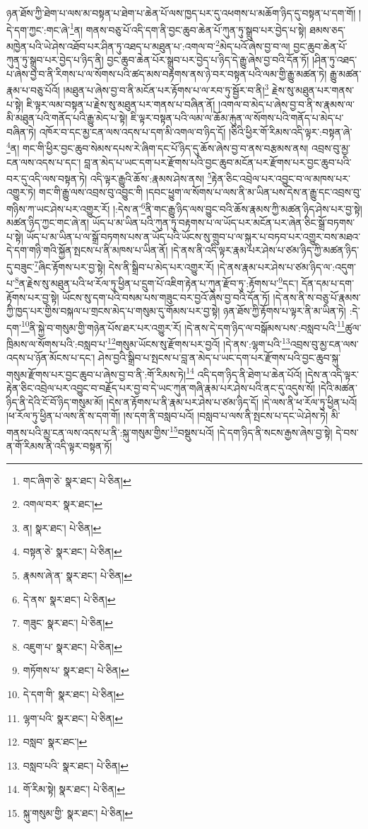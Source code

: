 ཉན་ཐོས་ཀྱི་ཐེག་པ་ལས་མ་བསྟན་པ་ཐེག་པ་ཆེན་པོ་ལས་ཁྱད་པར་དུ་འཕགས་པ་མཆོག་ཉིད་དུ་བསྟན་པ་དག་གོ། །དེ་དག་ཀྱང་:གང་ཞེ་\footnote{གང་ཞིག་ཅེ་  སྣར་ཐང་།  པེ་ཅིན། }ན། གནས་བཅུ་པོ་འདི་དག་ནི་བྱང་ཆུབ་ཆེན་པོ་ཀུན་ཏུ་སྒྲུབ་པར་བྱེད་པ་སྟེ། ཐམས་ཅད་མཁྱེན་པའི་ཡེ་ཤེས་འཐོབ་པར་ཤིན་ཏུ་འཐད་པ་མཐུན་པ་:འགལ་བ་\footnote{འགལ་བར་  སྣར་ཐང་། }མེད་པའོ་ཞེས་བྱ་བ་ལ། བྱང་ཆུབ་ཆེན་པོ་ཀུན་ཏུ་སྒྲུབ་པར་བྱེད་པ་ཉིད་ནི། བྱང་ཆུབ་ཆེན་པོར་སྒྲུབ་པར་བྱེད་པ་ཉིད་དེ་རྒྱུ་ཞེས་བྱ་བའི་དོན་ཏོ། །ཤིན་ཏུ་འཐད་པ་ཞེས་བྱ་བ་ནི་རིགས་པ་ལ་སོགས་པའི་ཚད་མས་བརྟགས་ནས་ཉེ་བར་བསྟན་པའི་ལམ་གྱི་རྒྱུ་མཚན་ཏེ། རྒྱུ་མཚན་རྣམ་པ་བཅུ་པོའོ། །མཐུན་པ་ཞེས་བྱ་བ་ནི་མངོན་པར་རྟོགས་པ་ལ་རབ་ཏུ་སྦྱོར་བ་ནི།\footnote{ན།  སྣར་ཐང་།  པེ་ཅིན། } རྗེས་སུ་མཐུན་པར་གནས་པ་སྟེ། ཇི་ལྟར་ལམ་བསྟན་པ་རྗེས་སུ་མཐུན་པར་གནས་པ་བཞིན་ནོ། །འགལ་བ་མེད་པ་ཞེས་བྱ་བ་ནི་ས་རྣམས་ལ་མི་མཐུན་པའི་གནོད་པའི་རྒྱུ་མེད་པ་སྟེ། ཇི་ལྟར་བསྟན་པའི་ལམ་ལ་ཆོམ་རྐུན་ལ་སོགས་པའི་གནོད་པ་མེད་པ་བཞིན་ཏེ། འཁོར་བ་དང་མྱ་ངན་ལས་འདས་པ་དག་མི་འགལ་བ་ཉིད་དོ། །ཅིའི་ཕྱིར་གོ་རིམས་འདི་ལྟར་:བསྟན་ཞེ་\footnote{བསྟན་ཅེ་  སྣར་ཐང་།  པེ་ཅིན། }ན། གང་གི་ཕྱིར་བྱང་ཆུབ་སེམས་དཔས་རེ་ཞིག་དང་པོ་ཉིད་དུ་ཆོས་ཞེས་བྱ་བ་ནས་བརྩམས་ནས། འབྲས་བུ་མྱ་ངན་ལས་འདས་པ་དང་། བླ་ན་མེད་པ་ཡང་དག་པར་རྫོགས་པའི་བྱང་ཆུབ་མངོན་པར་རྫོགས་པར་བྱང་ཆུབ་པའི་བར་དུ་འདི་ལས་བསྟན་ཏེ། འདི་ལྟར་རྒྱུའི་ཆོས་:རྣམས་ཤེས་ནས། \footnote{རྣམས་ཞེ་ན་  སྣར་ཐང་།  པེ་ཅིན། }རྟེན་ཅིང་འབྲེལ་པར་འབྱུང་བ་ལ་མཁས་པར་འགྱུར་ཏེ། གང་གི་རྒྱུ་ལས་འབྲས་བུ་འབྱུང་གི །དབང་ཕྱུག་ལ་སོགས་པ་ལས་ནི་མ་ཡིན་པས་དེས་ན་རྒྱུ་དང་འབྲས་བུ་གཉིས་ཀ་ཡང་ཤེས་པར་འགྱུར་རོ། །:དེས་ན་\footnote{དེ་ནས་  སྣར་ཐང་།  པེ་ཅིན། }ནི་གང་རྒྱུ་ཉིད་ལས་བྱུང་བའི་ཆོས་རྣམས་ཀྱི་མཚན་ཉིད་ཤེས་པར་བྱ་སྟེ། མཚན་ཉིད་ཀྱང་གང་ཞེ་ན། ཡོད་པ་མ་ཡིན་པའི་ཀུན་ཏུ་བརྟགས་པ་ལ་ཡོད་པར་མངོན་པར་ཞེན་ཅིང་སྒྲོ་བཏགས་པ་སྟེ། ཡོད་པ་མ་ཡིན་པ་ལ་སྒྲོ་བཏགས་པས་ན་ཡོད་པའི་ཡོངས་སུ་གྲུབ་པ་ལ་སྐུར་པ་བཏབ་པར་འགྱུར་བས་མཐའ་དེ་དག་གཉི་གའི་སྐྱོན་སྤངས་པ་ནི་མཁས་པ་ཡིན་ནོ། །དེ་ནས་ནི་འདི་ལྟར་རྣམ་པར་ཤེས་པ་ཙམ་ཉིད་ཀྱི་མཚན་ཉིད་དུ་བཟུང་\footnote{གཟུང་  སྣར་ཐང་།  པེ་ཅིན། }ཞིང་རྟོགས་པར་བྱ་སྟེ། དེས་ནི་སྒྲིབ་པ་མེད་པར་འགྱུར་རོ། །དེ་ནས་རྣམ་པར་ཤེས་པ་ཙམ་ཉིད་ལ་:འདུག་པ་\footnote{འཇུག་པ་  སྣར་ཐང་།  པེ་ཅིན། }ན་རྗེས་སུ་མཐུན་པའི་ཕ་རོལ་ཏུ་ཕྱིན་པ་དྲུག་པོ་འཇིག་རྟེན་པ་ཀུན་རྫོབ་ཏུ་:རྟོགས་པ་\footnote{གཏོགས་པ་  སྣར་ཐང་།  པེ་ཅིན། }དང་། དོན་དམ་པ་དག་རྟོགས་པར་བྱ་སྟེ། ཡོངས་སུ་དག་པའི་བསམ་པས་གཟུང་བར་བྱའོ་ཞེས་བྱ་བའི་དོན་ཏོ། །དེ་ནས་ནི་ས་བཅུ་པོ་རྣམས་ཀྱི་ཁྱད་པར་གྱིས་བསྐལ་པ་གྲངས་མེད་པ་གསུམ་དུ་གོམས་པར་བྱ་སྟེ། ཉན་ཐོས་ཀྱི་རྟོགས་པ་ལྟར་ནི་མ་ཡིན་ཏེ། :དེ་དག་\footnote{དེ་དག་གི་  སྣར་ཐང་།  པེ་ཅིན། }ནི་སྐྱེ་བ་གསུམ་གྱི་གཉེན་པོས་ཐར་པར་འགྱུར་རོ། །དེ་ནས་དེ་དག་ཉིད་ལ་བསྒོམས་པས་:བསླབ་པའི་\footnote{ལྷག་པའི་  སྣར་ཐང་།  པེ་ཅིན། }ཚུལ་ཁྲིམས་ལ་སོགས་པའི་:བསླབ་པ་\footnote{བསླབ་  སྣར་ཐང་། }གསུམ་ཡོངས་སུ་རྫོགས་པར་བྱའོ། །དེ་ནས་:ལྷག་པའི་\footnote{བསླབ་པའི་  སྣར་ཐང་།  པེ་ཅིན། }འབྲས་བུ་མྱ་ངན་ལས་འདས་པ་ཉོན་མོངས་པ་དང་། ཤེས་བྱའི་སྒྲིབ་པ་སྤངས་པ་བླ་ན་མེད་པ་ཡང་དག་པར་རྫོགས་པའི་བྱང་ཆུབ་སྐུ་གསུམ་རྫོགས་པར་བྱང་ཆུབ་པ་ཞེས་བྱ་བ་ནི་:གོ་རིམས་ཏེ།\footnote{གོ་རིམ་སྟེ།  སྣར་ཐང་།  པེ་ཅིན། } འདི་དག་ཉིད་ནི་ཐེག་པ་ཆེན་པོའོ། །དེས་ན་འདི་ལྟར་རྟེན་ཅིང་འབྲེལ་པར་འབྱུང་བ་བརྗོད་པར་བྱ་བ་དེ་ཡང་ཀུན་གཞི་རྣམ་པར་ཤེས་པའི་ནང་དུ་འདུས་སོ། །དེའི་མཚན་ཉིད་ནི་དེའི་ངོ་བོ་ཉིད་གསུམ་མོ། །དེས་ན་རྟོགས་པ་ནི་རྣམ་པར་ཤེས་པ་ཙམ་ཉིད་དོ། །དེ་ལས་ནི་ཕ་རོལ་ཏུ་ཕྱིན་པའོ། །ཕ་རོལ་ཏུ་ཕྱིན་པ་ལས་ནི་ས་དག་གོ། །ས་དག་ནི་བསླབ་པའོ། །བསླབ་པ་ལས་ནི་སྤངས་པ་དང་ཡེ་ཤེས་ཏེ། མི་གནས་པའི་མྱ་ངན་ལས་འདས་པ་ནི་:སྐུ་གསུམ་གྱིས་\footnote{སྐུ་གསུམ་གྱི་  སྣར་ཐང་།  པེ་ཅིན། }བསྡུས་པའོ། །དེ་དག་ཉིད་ནི་སངས་རྒྱས་ཞེས་བྱ་སྟེ། དེ་བས་ན་གོ་རིམས་ནི་འདི་ལྟར་བསྟན་ཏོ། 